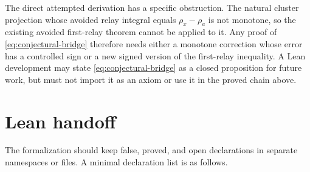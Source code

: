 \documentclass[11pt]{article}
\theoremstyle{definition}
\newcommand{\1}{\mathbf 1}
\begin{document}
The direct attempted derivation has a specific obstruction.  The natural
cluster projection whose avoided relay integral equals
\(\rho_x-\rho_a\) is not monotone, so the existing avoided first-relay
theorem cannot be applied to it.  Any proof of
\eqref{eq:conjectural-bridge} therefore needs either a monotone correction
whose error has a controlled sign or a new signed version of the
first-relay inequality.  A Lean development may state
\eqref{eq:conjectural-bridge} as a closed proposition for future work, but
must not import it as an axiom or use it in the proved chain above.

\section{Lean handoff}

The formalization should keep false, proved, and open declarations in
separate namespaces or files.  A minimal declaration list is as follows.
\end{document}
